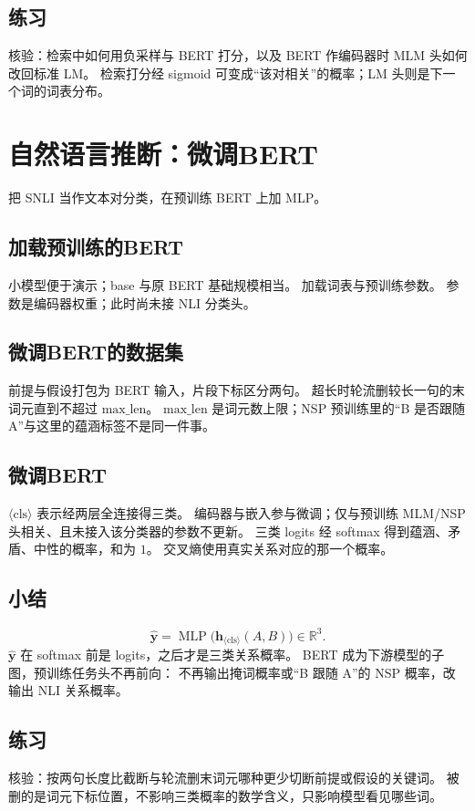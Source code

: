 \subsection{练习}

核验：检索中如何用负采样与 BERT 打分，以及 BERT 作编码器时 MLM 头如何改回标准 LM。
检索打分经 sigmoid 可变成“该对相关”的概率；LM 头则是下一个词的词表分布。

\section{自然语言推断：微调BERT}



把 SNLI 当作文本对分类，在预训练 BERT 上加 MLP。

\subsection{加载预训练的BERT}

小模型便于演示；base 与原 BERT 基础规模相当。
加载词表与预训练参数。
参数是编码器权重；此时尚未接 NLI 分类头。

\subsection{微调BERT的数据集}

前提与假设打包为 BERT 输入，片段下标区分两句。
超长时轮流删较长一句的末词元直到不超过 $\mathrm{max\_len}$。
$\mathrm{max\_len}$ 是词元数上限；NSP 预训练里的“B 是否跟随 A”与这里的蕴涵标签不是同一件事。

\subsection{微调BERT}

$\langle\mathrm{cls}\rangle$ 表示经两层全连接得三类。
编码器与嵌入参与微调；仅与预训练 MLM/NSP 头相关、且未接入该分类器的参数不更新。
三类 logits 经 softmax 得到蕴涵、矛盾、中性的概率，和为 $1$。
交叉熵使用真实关系对应的那一个概率。

\subsection{小结}

\[
\hat{\bm{y}}
=
\operatorname{MLP}\bigl(\bm{h}_{\langle\mathrm{cls}\rangle}(A,B)\bigr)
\in\mathbb{R}^{3}.
\]
$\hat{\bm{y}}$ 在 softmax 前是 logits，之后才是三类关系概率。
BERT 成为下游模型的子图，预训练任务头不再前向：
不再输出掩词概率或“B 跟随 A”的 NSP 概率，改输出 NLI 关系概率。

\subsection{练习}

核验：按两句长度比截断与轮流删末词元哪种更少切断前提或假设的关键词。
被删的是词元下标位置，不影响三类概率的数学含义，只影响模型看见哪些词。

